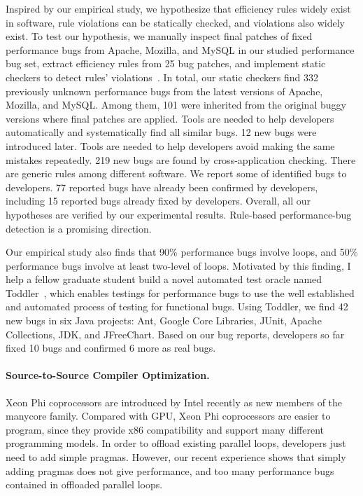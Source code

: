\documentclass[10pt]{article}
\begin{document}
Inspired by our empirical study, we hypothesize that 
efficiency rules widely exist in software, 
rule violations can be statically checked, 
and violations also widely exist. 
To test our hypothesis, we manually inspect final patches of fixed performance bugs from Apache, Mozilla, and MySQL in our studied performance bug set, 
extract efficiency rules from 25 bug patches, 
and implement static checkers to detect rules' violations~\cite{jin12perfbug}. 
In total, our static checkers find 332 previously unknown performance bugs from the latest versions of Apache, Mozilla, and MySQL. 
Among them, 101 were inherited from the original buggy versions where final patches are applied. 
Tools are needed to help developers automatically and systematically find all similar bugs. 
12 new bugs were introduced later. 
Tools are needed to help developers avoid making the same mistakes repeatedly. 
219 new bugs are found by cross-application checking. There are generic rules among different software. 
We report some of identified bugs to developers. 
77 reported bugs have already been confirmed by developers, including 15 reported bugs already fixed by developers. 
Overall, all our hypotheses are verified by our experimental results. Rule-based performance-bug detection is a promising direction.

Our empirical study also finds that 90\% performance bugs involve loops, 
and 50\% performance bugs involve at least two-level of loops. 
Motivated by this finding, I help a fellow graduate student build a novel automated test oracle named Toddler~\cite{Nistor13ICSE}, 
which enables testings for performance bugs to use the well established and automated process of testing for functional bugs. 
Using Toddler, we find 42 new bugs in six Java projects: 
Ant, Google Core Libraries, JUnit, Apache Collections, JDK, and JFreeChart. 
Based on our bug reports, developers so far fixed 10 bugs and confirmed 6 more as real bugs.


\paragraph{Source-to-Source Compiler Optimization.}
Xeon Phi coprocessors are introduced by Intel recently as new members of the manycore family. 
Compared with GPU, Xeon Phi coprocessors are easier to program, 
since they provide x86 compatibility and support many different programming models. 
In order to offload existing parallel loops, developers just need to add simple pragmas. 
However, our recent experience shows that simply adding pragmas does not give performance, 
and too many performance bugs contained in offloaded parallel loops. 
\end{document}
